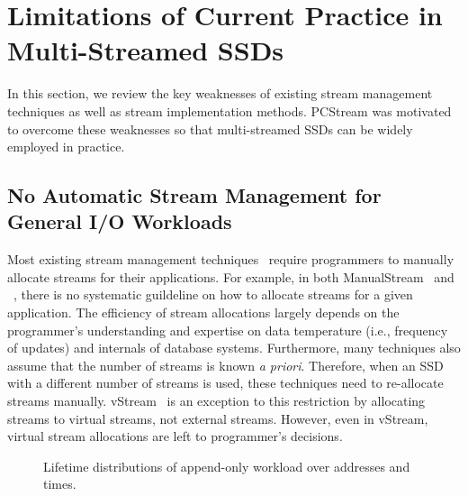 \vspace{-10pt}
\section{Limitations of Current Practice in Multi-Streamed SSDs}
\vspace{-4pt}
In this section, we review the key weaknesses of existing stream management techniques 
as well as stream implementation methods.  
\textsf{\small PCStream} was motivated to overcome these weaknesses so that multi-streamed
SSDs can be widely employed in practice.

\vspace{-10pt}
\subsection{No Automatic Stream Management for General I/O Workloads}
Most existing stream management techniques~\cite{MultiStream, Level, vStream} 
require programmers to manually allocate streams for their applications.
For example, 
in both \textsf{\small ManualStream}~\cite{MultiStream} and 
~\cite{Level}, there is no systematic guildeline on how to
allocate streams for a given application. 
The efficiency of stream allocations largely depends on the programmer's 
understanding and expertise on data temperature (i.e., frequency of updates)
and internals of database systems.
Furthermore, many
techniques also assume that the number of streams is known {\it a priori}.  
Therefore, when an SSD with a different number of streams is used, 
these techniques need to re-allocate streams manually.
\textsf{\small vStream}~\cite{vStream} 
is an exception to this 
restriction by allocating streams to virtual streams, not external streams.  
However, even in \textsf{\small vStream}, virtual stream allocations are left to
programmer's decisions.

\begin{figure}[t]
	\centering

	\hfill

	\vspace{-10pt}
	\hspace{10pt}
	\vspace{-3pt}
	\caption{Lifetime distributions of append-only workload over addresses and times.} %
	\label{fig:lba_lifetime}
	\vspace{-20pt}
\end{figure}


